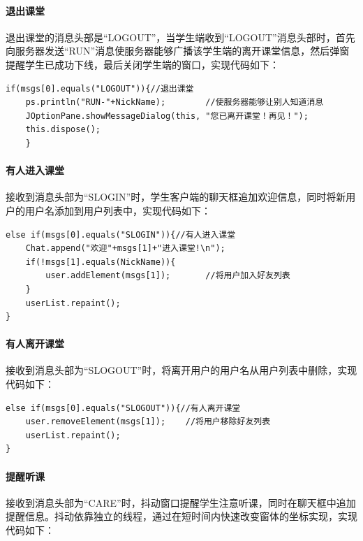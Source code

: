 \documentclass[UTF8,12pt]{article}
\begin{document}
\paragraph{退出课堂}
退出课堂的消息头部是“LOGOUT”，当学生端收到“LOGOUT”消息头部时，首先向服务器发送“RUN”消息使服务器能够广播该学生端的离开课堂信息，然后弹窗提醒学生已成功下线，最后关闭学生端的窗口，实现代码如下：

\begin{lstlisting}[title=退出课堂,frame=shadowbox]
    if(msgs[0].equals("LOGOUT")){//退出课堂
    ps.println("RUN-"+NickName);        //使服务器能够让别人知道消息
    JOptionPane.showMessageDialog(this, "您已离开课堂！再见！");
    this.dispose();
    }
\end{lstlisting}

\paragraph{有人进入课堂}
接收到消息头部为“SLOGIN”时，学生客户端的聊天框追加欢迎信息，同时将新用户的用户名添加到用户列表中，实现代码如下：

\begin{lstlisting}[title=有人进入课堂,frame=shadowbox]
    else if(msgs[0].equals("SLOGIN")){//有人进入课堂
    Chat.append("欢迎"+msgs[1]+"进入课堂!\n");
    if(!msgs[1].equals(NickName)){
        user.addElement(msgs[1]);       //将用户加入好友列表
    }
    userList.repaint();
}
\end{lstlisting}

\paragraph{有人离开课堂}
接收到消息头部为“SLOGOUT”时，将离开用户的用户名从用户列表中删除，实现代码如下：

\begin{lstlisting}[title=有人离开课堂,frame=shadowbox]
    else if(msgs[0].equals("SLOGOUT")){//有人离开课堂
    user.removeElement(msgs[1]);    //将用户移除好友列表
    userList.repaint();
}
\end{lstlisting}

\paragraph{提醒听课}
接收到消息头部为“CARE”时，抖动窗口提醒学生注意听课，同时在聊天框中追加提醒信息。抖动依靠独立的线程，通过在短时间内快速改变窗体的坐标实现，实现代码如下：
\end{document}
